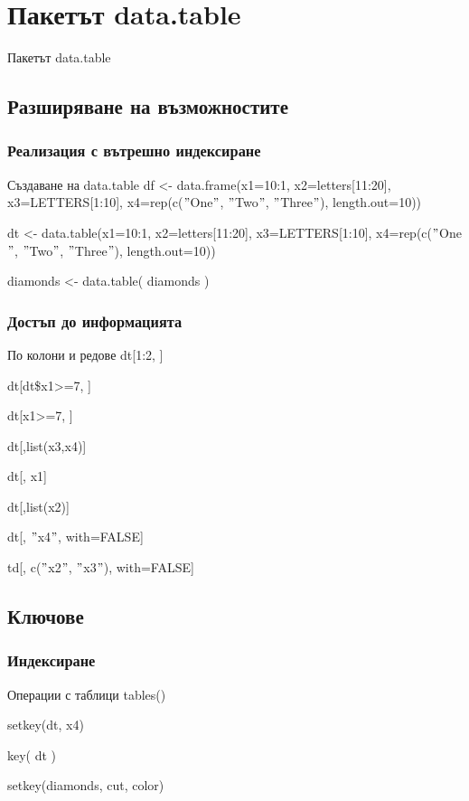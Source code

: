 \documentclass{beamer}
\begin{document}
\section{Пакетът data.table}

\begin{frame}
\center \huge{Пакетът data.table}
\end{frame}

\subsection{Разширяване на възможностите}

\begin{frame}
\frametitle{Реализация с вътрешно индексиране}
\begin{block}{Създаване на data.table}
df <- data.frame(x1=10:1, x2=letters[11:20], x3=LETTERS[1:10], x4=rep(c($"$One$"$, $"$Two$"$, $"$Three$"$), length.out=10))

dt <- data.table(x1=10:1, x2=letters[11:20], x3=LETTERS[1:10], x4=rep(c($"$One$"$, $"$Two$"$, $"$Three$"$), length.out=10))

diamonds <- data.table( diamonds )
\end{block}
\end{frame}

\begin{frame}
\frametitle{Достъп до информацията}
\begin{block}{По колони и редове}
dt[1:2, ]

dt[dt\$x1>=7, ]

dt[x1>=7, ]

dt[,list(x3,x4)]

dt[, x1]

dt[,list(x2)]

dt[, $"$x4$"$, with=FALSE]


td[, c($"$x2$"$, $"$x3$"$), with=FALSE]
\end{block}
\end{frame}

\subsection{Ключове}

\begin{frame}
\frametitle{Индексиране}
\begin{block}{Операции с таблици}
tables()

setkey(dt, x4)

key( dt )

setkey(diamonds, cut, color)
\end{block}
\end{frame}
\end{document}
